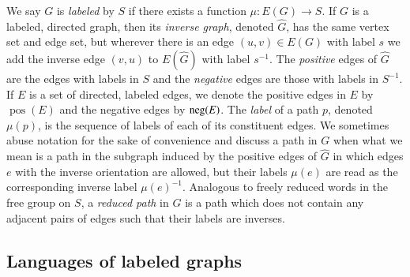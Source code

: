 \documentclass{elsarticlenonatbib}
\DeclareMathOperator{\pos}{pos}
\newcommand{\nega}{\textnormal{neg}}
\begin{document}
We say $G$ is \emph{labeled} by $S$ if there exists a function $\mu \colon E(G) \to S$.
If $G$ is a labeled, directed graph, then its \emph{inverse graph}, denoted $\hat{G}$, has the same vertex set and edge set, but wherever there is an edge $(u, v) \in E(G)$ with label $s$ we add the inverse edge $(v, u)$ to $E(\hat{G})$ with label $s^{-1}$.
The \emph{positive} edges of $\hat{G}$ are the edges with labels in $S$ and the \emph{negative} edges are those with labels in $S^{-1}$.
If $E$ is a set of directed, labeled edges, we denote the positive edges in $E$ by $\pos(E)$ and the negative edges by $\nega(E)$.
The \emph{label} of a path $p$, denoted $\mu(p)$, is the sequence of labels of each of its constituent edges.
We sometimes abuse notation for the sake of convenience and discuss a path in $G$ when what we mean is a path in the subgraph induced by the positive edges of $\hat{G}$ in which edges $e$ with the inverse orientation are allowed, but their labels $\mu(e)$ are read as the corresponding inverse label $\mu(e)^{-1}$.
Analogous to freely reduced words in the free group on $S$, a \emph{reduced path} in $G$ is a path which does not contain any adjacent pairs of edges such that their labels are inverses.

\subsection{Languages of labeled graphs}
\end{document}
